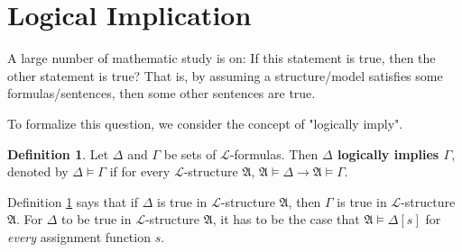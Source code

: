 \documentclass[11pt,letterpaper]{book}
\theoremstyle{definition}
\newtheorem{definition}{Definition}[section]
\begin{document}
\section{Logical Implication}


A large number of mathematic study is on: If this statement is true,
then the other statement is true? That is, by assuming a structure/model
satisfies some formulas/sentences, then some other sentences are true.

To formalize this question, we consider the concept of "logically imply".


\begin{definition}\label{def:logical_imply}
Let $\Delta$ and $\Gamma$ be sets of $\mathcal{L}$-formulas. Then
\textbf{$\Delta$ logically implies $\Gamma$}, denoted by $\Delta \models
\Gamma $ if for every $\mathcal{L}$-structure $\mathfrak{A}$,
$\mathfrak{A} \models \Delta \rightarrow \mathfrak{A} \models \Gamma$.
\end{definition}


Definition \ref{def:logical_imply} says that if $\Delta$ is true in
$\mathcal{L}$-structure $\mathfrak{A}$, then $\Gamma$ is true in
$\mathcal{L}$-structure $\mathfrak{A}$. For $\Delta$ to be true in
$\mathcal{L}$-structure $\mathfrak{A}$, it has to be the case that
$\mathfrak{A}\models \Delta[s]$ for \emph{every} assignment function $s$.
\end{document}
